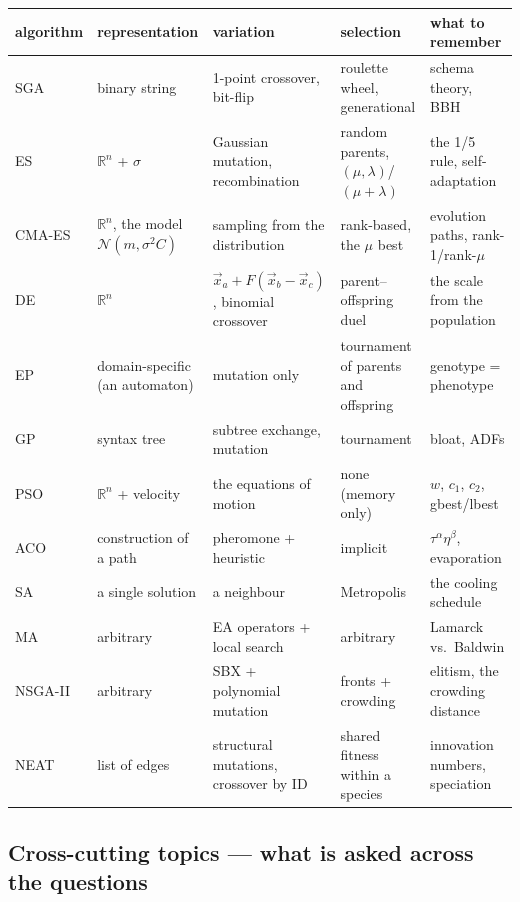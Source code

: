 \documentclass[11pt,a4paper]{article}
\theoremstyle{definition}
\begin{document}
\begin{center}
\small
\begin{tabular}{@{}p{2.5cm}p{2.9cm}p{3.1cm}p{3.1cm}p{3.1cm}@{}}
\toprule
\textbf{algorithm} & \textbf{representation} & \textbf{variation} &
\textbf{selection} & \textbf{what to remember} \\
\midrule
SGA & binary string & 1-point crossover, bit-flip & roulette wheel,
  generational & schema theory, BBH \\
ES & $\mathbb{R}^n$ + $\sigma$ & Gaussian mutation, recombination &
  random parents, $(\mu,\lambda)$/$(\mu{+}\lambda)$ & the 1/5 rule,
  self-adaptation \\
CMA-ES & $\mathbb{R}^n$, the model $\mathcal N(m,\sigma^2 C)$ & sampling
  from the distribution & rank-based, the $\mu$ best & evolution paths,
  rank-1/rank-$\mu$ \\
DE & $\mathbb{R}^n$ & $\vec x_a + F(\vec x_b - \vec x_c)$, binomial crossover &
  parent--offspring duel & the scale from the population \\
EP & domain-specific (an automaton) & mutation only & tournament of parents
  and offspring & genotype = phenotype \\
GP & syntax tree & subtree exchange, mutation & tournament &
  bloat, ADFs \\
PSO & $\mathbb{R}^n$ + velocity & the equations of motion & none (memory only) &
  $w$, $c_1$, $c_2$, gbest/lbest \\
ACO & construction of a path & pheromone + heuristic & implicit &
  $\tau^\alpha\eta^\beta$, evaporation \\
SA & a single solution & a neighbour & Metropolis & the cooling schedule \\
MA & arbitrary & EA operators + local search & arbitrary &
  Lamarck vs.\ Baldwin \\
NSGA-II & arbitrary & SBX + polynomial mutation & fronts + crowding &
  elitism, the crowding distance \\
NEAT & list of edges & structural mutations, crossover by ID & shared fitness
  within a species & innovation numbers, speciation \\
\bottomrule
\end{tabular}
\end{center}

\subsection*{Cross-cutting topics --- what is asked across the questions}
\end{document}
